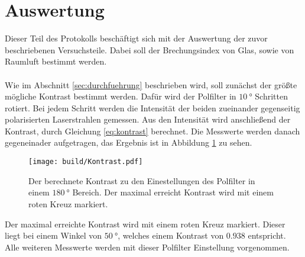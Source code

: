 \newpage
\section{Auswertung}
\label{sec:auswertung}

Dieser Teil des Protokolls beschäftigt sich mit der Auswertung der zuvor beschriebenen Versuchsteile.
Dabei soll der Brechungsindex von Glas, sowie von Raumluft bestimmt werden.\\\\
Wie im Abschnitt \ref{sec:durchfuehrung} beschrieben wird, soll zunächst der größte mögliche Kontrast bestimmt werden.
Dafür wird der Polfilter in $\SI{10}{\degree}$ Schritten rotiert.
Bei jedem Schritt werden die Intensität der beiden zueinander gegenseitig polarisierten Laserstrahlen gemessen.
Aus den Intensität wird anschließend der Kontrast, durch Gleichung \eqref{eq:kontrast} berechnet.
Die Messwerte werden danach gegeneinader aufgetragen, das Ergebnis ist in Abbildung \ref{fig:Kontrast} zu sehen.
\begin{figure}
    \centering
    \texttt{[image: build/Kontrast.pdf]}
    \caption{Der berechnete Kontrast zu den Einestellungen des Polfilter in einem $\SI{180}{\degree}$ Bereich.
    Der maximal erreicht Kontrast wird mit einem roten Kreuz markiert.}
    \label{fig:Kontrast}
\end{figure}
Der maximal erreichte Kontrast wird mit einem roten Kreuz markiert.
Dieser liegt bei einem Winkel von $\SI{50}{\degree}$, welches einem Kontrast von $0.938$ entspricht.
Alle weiteren Messwerte werden mit dieser Polfilter Einstellung vorgenommen.
